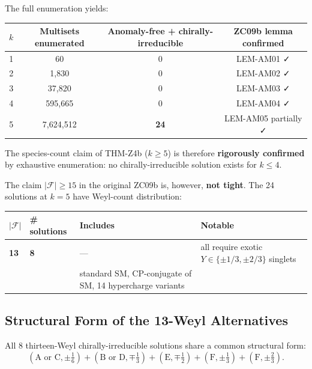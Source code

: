 \documentclass[12pt, a4paper]{article}
\begin{document}
\begin{formalbox}[title={FIND-Z4M01: Exhaustive minimality enumeration (NEW v17.5)}]
The full enumeration yields:

\begin{center}
{\small
\renewcommand{\arraystretch}{1.30}
\begin{tabular}{cccc}
\toprule
$k$ & Multisets enumerated & Anomaly-free + chirally-irreducible & ZC09b lemma confirmed \\
\midrule
1 & 60         & 0  & LEM-AM01 ✓ \\
2 & 1{,}830     & 0  & LEM-AM02 ✓ \\
3 & 37{,}820    & 0  & LEM-AM03 ✓ \\
4 & 595{,}665   & 0  & LEM-AM04 ✓ \\
5 & 7{,}624{,}512 & \textbf{24} & LEM-AM05 partially ✓ \\
\bottomrule
\end{tabular}
}
\end{center}

The species-count claim of THM-Z4b ($k \geq 5$) is therefore
\textbf{rigorously confirmed} by exhaustive enumeration: no
chirally-irreducible solution exists for $k \leq 4$.

The claim $|\mathcal{F}| \geq 15$ in the original ZC09b is, however,
\textbf{not tight}. The 24 solutions at $k = 5$ have Weyl-count
distribution:
\begin{center}
{\small
\renewcommand{\arraystretch}{1.30}
\begin{tabular}{>{\centering}p{1.2cm}>{\centering}p{1.8cm}>{\raggedright}p{5.5cm}>{\raggedright\arraybackslash}p{3.5cm}}
\toprule
$|\mathcal{F}|$ & \# solutions & Includes & Notable \\
\midrule
\textbf{13} & \textbf{8} & --- & all require exotic $Y \in \{\pm 1/3, \pm 2/3\}$ singlets \\
15 & 16 & standard SM, CP-conjugate of SM, 14 hypercharge variants & \\
\bottomrule
\end{tabular}
}
\end{center}
\end{formalbox}

\subsection{Structural Form of the 13-Weyl Alternatives}

All 8 thirteen-Weyl chirally-irreducible solutions share a common
structural form:
\begin{equation}
  \boxed{
  (\text{A or C}, \pm \tfrac{1}{6})
  + (\text{B or D}, \mp \tfrac{1}{3})
  + (\text{E}, \mp \tfrac{1}{2})
  + (\text{F}, \pm \tfrac{1}{3})
  + (\text{F}, \pm \tfrac{2}{3}).
  }
  \tag{EQ-Z4M01}\label{eq:13Weyl-form}
\end{equation}
\end{document}
